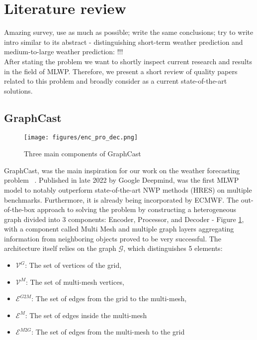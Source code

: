  \newpage
 \section{Literature review}
 Amazing survey, use as much as possible; write the same conclusions; try to write intro similar to its abstract - distinguishing short-term weather prediction and medium-to-large weather prediction: \cite{app132112019}!!! \\ 
\noindent After stating the problem we want to shortly inspect current research and results in the field of MLWP. Therefore, we present a short review of quality papers related to this problem and broadly consider as a current state-of-the-art solutions.

\subsection{GraphCast}
\begin{figure}[!ht]
    \centering
    \texttt{[image: figures/enc\_pro\_dec.png]}
    \caption{Three main components of GraphCast \cite{lam2023graphcast}}
    \label{fig:enc_pro_dec}
\end{figure}

\noindent GraphCast, was the main inspiration for our work on the weather forecasting problem ~\cite{lam2023graphcast}. Published in late 2022 by Google Deepmind, was the first MLWP model to notably outperform state-of-the-art NWP methods (HRES) on multiple benchmarks. Furthermore, it is already being incorporated by ECMWF. The out-of-the-box approach to solving the problem by constructing a heterogeneous graph divided into 3 components: Encoder, Processor, and Decoder - Figure \ref{fig:enc_pro_dec}, with a component called Multi Mesh and multiple graph layers aggregating information from neighboring objects proved to be very successful. The architecture itself relies on the graph $\mathcal{G}$, which distinguishes 5 elements:
\begin{itemize}
    \item $\mathcal{V}^{G}$: The set of vertices of the grid,
    \item $\mathcal{V}^M$: The set of multi-mesh vertices,
    \item $\mathcal{E}^{G2M}$: The set of edges from the grid to the multi-mesh,
    \item $\mathcal{E}^{M}$: The set of edges inside the multi-mesh
    \item $\mathcal{E}^{M2G}$: The set of edges from the multi-mesh to the grid
\end{itemize} 

